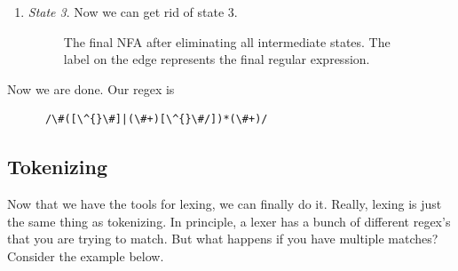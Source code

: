 \begin{example}
\begin{enumerate}
      \item \textit{State 3}. Now we can get rid of state 3. 

        \begin{figure}[H]
          \centering
          \caption{The final NFA after eliminating all intermediate states. The label on the edge represents the final regular expression.}
          \label{fig:final_regex}
        \end{figure}
    \end{enumerate}

    Now we are done. Our regex is 
    \begin{lstlisting}
      /\#([\^{}\#]|(\#+)[\^{}\#/])*(\#+)/ 
    \end{lstlisting}
  \end{example}

\subsection{Tokenizing} 

  Now that we have the tools for lexing, we can finally do it. Really, lexing is just the same thing as tokenizing. In principle, a lexer has a bunch of different regex's that you are trying to match. But what happens if you have multiple matches? Consider the example below. 

